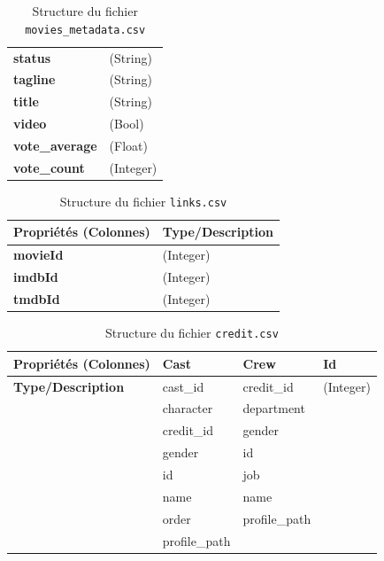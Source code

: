 \documentclass[a4paper,12pt]{report}
\begin{document}
\begin{enumerate}[label=A.\arabic*, leftmargin=1.7cm]
\begin{table}[h]
\begin{tabular}{@{}ll@{}}
                \textbf{status} & (String)\\
                \textbf{tagline} & (String)\\
                \textbf{title} & (String)\\
                \textbf{video} & (Bool)\\
                \textbf{vote\_average} & (Float)\\
                \textbf{vote\_count} & (Integer)\\
                \bottomrule
            \end{tabular}
            \caption{Structure du fichier \texttt{movies\_metadata.csv}}
        \end{table}

        \begin{table}[h]
            \centering
            \begin{tabular}{@{}ll@{}}
                \toprule
                \textbf{Propriétés (Colonnes)} & \textbf{Type/Description} \\
                \midrule
                \textbf{movieId} & (Integer) \\
                \textbf{imdbId} & (Integer) \\
                \textbf{tmdbId} & (Integer) \\
                \bottomrule
            \end{tabular}
            \caption{Structure du fichier \texttt{links.csv}}
        \end{table}
    
        \begin{table}[h]
            \centering
            \begin{tabular}{@{}llll@{}}
                \toprule
                \textbf{Propriétés (Colonnes)} & \textbf{Cast} & \textbf{Crew} & \textbf{Id} \\
                \midrule
                \textbf{Type/Description} & cast\_id & credit\_id & (Integer) \\
                &character & department \\
                &credit\_id & gender \\
                &gender & id \\
                &id & job \\
                &name & name \\
                &order & profile\_path \\
                &profile\_path \\
                \bottomrule
            \end{tabular}
            \caption{Structure du fichier \texttt{credit.csv}}
        \end{table}


\end{enumerate}
\end{document}
